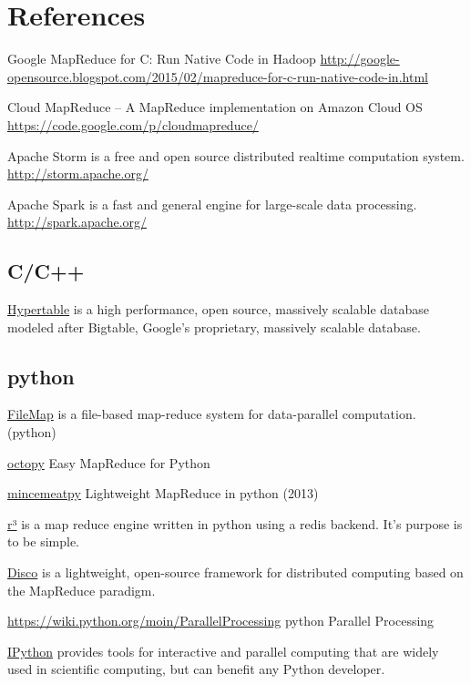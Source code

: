 \documentclass[letter,11pt,onecolumn]{book}
\begin{document}
\chapter{References}

Google MapReduce for C: Run Native Code in Hadoop
\url{http://google-opensource.blogspot.com/2015/02/mapreduce-for-c-run-native-code-in.html}



Cloud MapReduce -- A MapReduce implementation on Amazon Cloud OS
\url{https://code.google.com/p/cloudmapreduce/}


Apache Storm is a free and open source distributed realtime computation system.
\url{http://storm.apache.org/}

Apache Spark is a fast and general engine for large-scale data processing.
\url{http://spark.apache.org/}


\section{C/C++}


\href{http://hypertable.com/}{Hypertable} is a high performance, open source, massively scalable database modeled after Bigtable, Google's proprietary, massively scalable database.

\section{python}


\href{https://github.com/mfisk/filemap.git}{FileMap} is a file-based map-reduce system for data-parallel computation. (python)

\href{https://code.google.com/p/octopy/}{octopy} Easy MapReduce for Python

\href{https://github.com/michaelfairley/mincemeatpy.git}{mincemeatpy} Lightweight MapReduce in python (2013)

\href{http://heynemann.github.io/r3/}{r³} is a map reduce engine written in python using a redis backend. It's purpose is to be simple.


\href{http://discoproject.org/}{Disco} is a lightweight, open-source framework for distributed computing based on the MapReduce paradigm.



\url{https://wiki.python.org/moin/ParallelProcessing}
python Parallel Processing

\href{http://ipython.org/}{IPython} provides tools for interactive and parallel computing that are widely used in scientific computing, but can benefit any Python developer.
\end{document}
